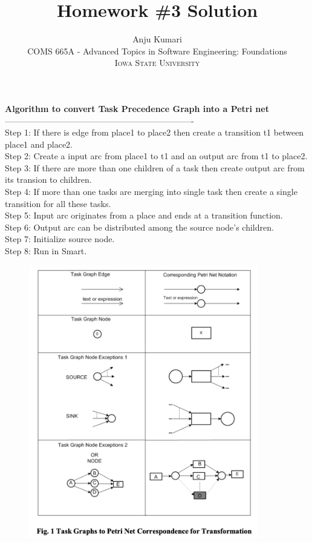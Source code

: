 \documentclass{article}
\title{Homework \#3 Solution} %
\author{Anju Kumari\\ %
COMS 665A -  Advanced Topics in Software Engineering: Foundations\\ %
\textsc{Iowa State University}
}
\date{}
\begin{document}
\maketitle

{\bf Algorithm to convert Task Precedence Graph into a  Petri net} \\
-------------------------------------------------------------------\\

Step 1:  If there is edge from place1 to place2 then create a transition t1  between place1 and place2. \\
Step 2: Create a input arc from place1 to t1 and an output arc from t1 to place2.\\
Step 3: If there are more than one children of a task then create output arc from its transion to children.  \\
Step 4: If more than one tasks are merging into single task then create a single transition for all these tasks. \\
Step 5: Input arc originates from a place and ends at a transition function. \\
Step 6: Output arc can be distributed among the source node's children. \\
Step 7: Initialize source node. \\
Step 8: Run in Smart.


\begin{figure}[h]
\includegraphics[width=10cm]{pn}
\end{figure}


 
\end{document}
